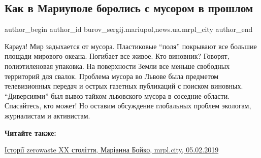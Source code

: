  
 
 
 
 
 
\subsection{Как в Мариуполе боролись с мусором в прошлом}
\label{sec:28_09_2019.stz.news.ua.mrpl_city.1.kak_v_mariupole_borolis_s_musorom}
 
\ifcmt
 author_begin
   author_id burov_sergij.mariupol,news.ua.mrpl_city
 author_end
\fi

Караул! Мир задыхается от мусора. Пластиковые \enquote{поля} покрывают все большие
площади мирового океана. Погибает все живое. Кто виновник? Говорят,
полиэтиленовая упаковка. На поверхности Земли все меньше свободных территорий
для свалок. Проблема мусора во Львове была предметом телевизионных передач и
острых газетных публикаций с поиском виновных. \enquote{Диверсиями} был вывоз тайком
львовского мусора в соседние области. Спасайтесь, кто может! Но оставим
обсуждение глобальных проблем экологам, журналистам и активистам.


\textbf{Читайте также:} 

\href{https://mrpl.city/blogs/view/kak-v-mariupole-borolis-s-musorom-v-proshlom}{%
Історії zerowaste XX століття, Маріанна Бойко, mrpl.city, 05.02.2019}

